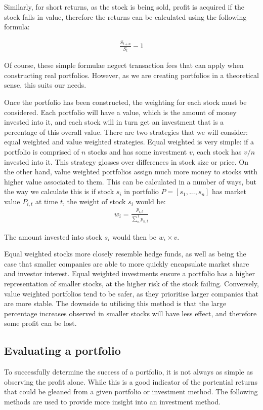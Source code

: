 \documentclass[ oneside,%
                    author={Joshua Felmeden},
                    degree={MEng},
                     title={Semantic Analysis of Financial Headlines Based on Realised Stock Returns},
                  subtitle={}]{dissertation}
\begin{document}
Similarly, for short returns, as the stock is being sold, profit is acquired if the stock falls in value, therefore the returns can be calculated using the following formula:

\begin{align*}
\frac{S_{t+n}}{S_{t}} - 1
\end{align*}

Of course, these simple formulae negect transaction fees that can apply when constructing real portfolios. However, as we are creating portfolios in a theoretical sense, this suits our needs.

Once the portfolio has been constructed, the weighting for each stock must be considered. Each portfolio will have a value, which is the amount of money invested into it, and each stock will in turn get an investment that is a percentage of this overall value. There are two strategies that we will consider: equal weighted and value weighted strategies. Equal weighted is very simple: if a portfolio is comprised of $n$ stocks and has some investment $v$, each stock has $v/n$ invested into it. This strategy glosses over differences in stock size or price. On the other hand, value weighted portfolios assign much more money to stocks with higher value associated to them. This can be calculated in a number of ways, but the way we calculate this is if stock $s_i$ in portfolio $P = [s_1, ..., s_n]$ has market value $P_{i,t}$ at time $t$, the weight of stock $s_i$ would be:
\begin{align*}
w_i = \frac{p_{i,t}}{\sum_{n}^1 p_{n,t}}
\end{align*}

\noindent
The amount invested into stock $s_i$ would then be $w_i \times v$.

Equal weighted stocks more closely resemble hedge funds, as well as being the case that smaller companies are able to more quickly encapsulate market share and investor interest. Equal weighted investments ensure a portfolio has a higher representation of smaller stocks, at the higher risk of the stock failing. Conversely, value weighted portfolios tend to be safer, as they prioritise larger companies that are more stable. The downside to utilising this method is that the large percentage increases observed in smaller stocks will have less effect, and therefore some profit can be lost.
\subsection{Evaluating a portfolio}
To successfully determine the success of a portfolio, it is not always as simple as observing the profit alone. While this is a good indicator of the portential returns that could be gleaned from a given portfolio or investment method. The following methods are used to provide more insight into an investment method.
\end{document}
